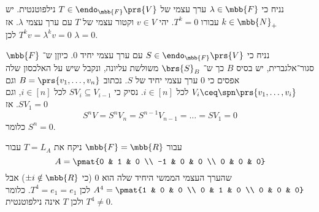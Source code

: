 \documentclass[a4paper,10pt,oneside,openany]{article}
\begin{document}
\begin{solution}
נניח כי
$\lambda \in \mbb{F}$
ערך עצמי של
$T \in \endo_{\mbb{F}}\prs{V}$
נילפוטנטית.
יש
$k \in \mbb{N}_+$
עבורו
$T^k = 0$.
יהי
$v \in V$
וקטור עצמי של
$T$
עם ערך עצמי
$\lambda$.
אז
$T^k v = \lambda^k v = 0$
לכן
$\lambda = 0$.

נניח כי
$S \in \endo_{\mbb{F}}\prs{V}$
עם ערך עצמי יחיד
$0$.
כיוןן ש־%
$\mbb{F}$
סגור־אלגברית,
יש בסיס
$B$
כך ש־%
$\brs{S}_B$
משולשת עליונה, ונקבל שיש על האלכסון שלה אפסים כי
$0$
ערך עצמי יחיד של
$S$.
נכתוב
$B = \prs{v_1, \ldots, v_n}$
וגם
$V_i \ceq \spn\prs{v_1, \ldots, v_i}$
לכל
$i \in [n]$.
נסיק כי
$S V_i \subseteq V_{i-1}$
לכל
$i \in [n]$,
וגם
$S V_1 = 0$.
אז
\[S^n V = S^n V_n = S^{n-1} V_{n-1} = \ldots = S V_1 = 0\]
כלומר
$S^n = 0$.

עבור
$\mbb{F} = \mbb{R}$
ניקח את
$T = L_A$
עבור
\[A = \pmat{0 & 1 & 0 \\ -1 & 0 & 0 \\ 0 & 0 & 0}\]
שהערך העצמי הממשי היחיד שלה הוא
$0$
(כי
$\pm i \notin \mbb{R}$)
אבל
$A^4 = \pmat{1 & 0 & 0 \\ 0 & 1 & 0 \\ 0 & 0 & 0}$
לכן
$T^4 = e_1 = e_1$.
כלומר
$T^4 \neq 0$
ולכן
$T$
אינה נילפוטנטית.
\end{solution}
\end{document}
